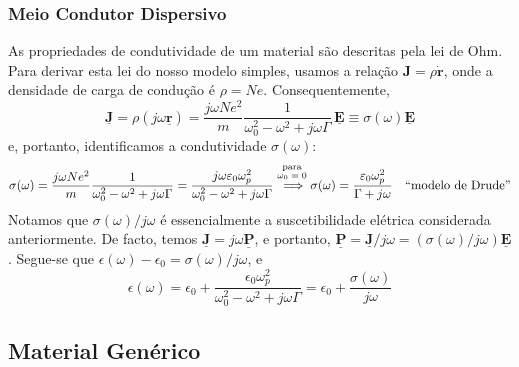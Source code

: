 \begin{warning}
\end{warning}

\subsubsection{Meio Condutor Dispersivo}

As propriedades de condutividade de um material são descritas pela lei de Ohm. Para derivar esta lei do nosso modelo simples, usamos a relação $\mathbf{J} = \rho \dot{\mathbf{r}}$, onde a densidade de carga de condução é $\rho = Ne$. Consequentemente,
$$
    \mathbf{\underline{J}} = \rho (j\omega\mathbf{\underline{r}}) = \frac{j\omega Ne^2}{m} \frac{1}{\omega_0^2 - \omega^2 + j\omega\Gamma}\, \mathbf{\underline{E}} \equiv \sigma(\omega)\mathbf{\underline{E}}
$$
e, portanto, identificamos a condutividade $\sigma(\omega)$:
$$
    \sigma(\omega) = \frac{j\omega Ne^2}{m} \frac{1}{\omega_0^2 - \omega^2 + j\omega\Gamma} = \frac{j\omega\epsilon_0\omega_p^2}{\omega_0^2 - \omega^2 + j\omega\Gamma}
    \overset{\substack{\text{para}\\\text{$\omega_0 = 0$}\vspace{1mm}}}{\:\implies}
    \sigma(\omega) = \frac{\epsilon_0 \omega^{2}_{p}}{\Gamma + j\omega}
    \quad \text{``modelo de Drude''}
$$
Notamos que $\sigma(\omega)/j\omega$ é essencialmente a suscetibilidade elétrica considerada anteriormente. De facto, temos $\mathbf{\underline{J}} = j\omega \mathbf{\underline{P}}$, e portanto, $\mathbf{\underline{P}} = \mathbf{\underline{J}}/j\omega = (\sigma(\omega)/j\omega) \mathbf{\underline{E}}$. Segue-se que $\epsilon(\omega) - \epsilon_0 = \sigma(\omega)/j\omega$, e
$$
    \epsilon(\omega) = \epsilon_0 + \frac{\epsilon_0\omega_p^2}{\omega_0^2 - \omega^2 + j\omega\Gamma} = \epsilon_0 + \frac{\sigma(\omega)}{j\omega}
$$

\subsection{Material Genérico} \label{sec:material-generico-dispersivo}


